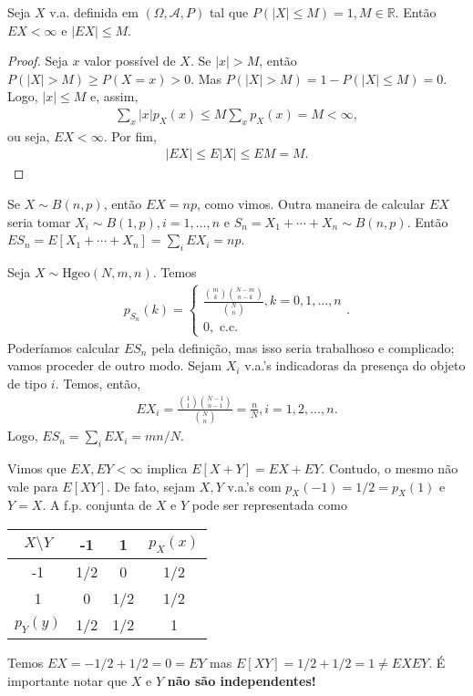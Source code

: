 \documentclass[../Notas.tex]{subfiles}
\begin{document}
\begin{theorem}
Seja $X$ v.a. definida em $(\Omega, \mathcal{A}, P)$ tal que $P(|X|\leq M) = 1, M\in\mathbb{R}$. Então $EX < \infty$ e $|EX|\leq M$.
\end{theorem}

\begin{proof}
Seja $x$ valor possível de $X$. Se $|x|>M$, então $P(|X|>M)\geq P(X=x)>0$. Mas $P(|X|>M) = 1 - P(|X|\leq M) = 0$. Logo, $|x|\leq M$ e, assim,
\begin{align*}
    \sum_x |x|p_X(x) \leq M\sum_x p_X(x) = M < \infty,
\end{align*}
ou seja, $EX < \infty$. Por fim,
\begin{align*}
    |EX| \leq E|X| \leq EM = M.
\end{align*}
\end{proof}

\begin{example}
Se $X\sim B(n,p)$, então $EX = np$, como vimos. Outra maneira de calcular $EX$ seria tomar $X_i\sim B(1,p), i=1,\dots, n$ e $S_n = X_1 + \cdots + X_n\sim B(n,p)$. Então $ES_n = E[X_1 + \cdots + X_n] = \sum_i EX_i = np$.
\end{example}

\begin{example}
Seja $X\sim\text{Hgeo}(N,m,n)$. Temos
\begin{align*}
    p_{S_n}(k) = \begin{cases}
    \frac{ \binom{m}{k}\binom{N-m}{n-k} }{ \binom{N}{n} }, k = 0,1,\dots,n \\
    0, \text{ c.c.}
    \end{cases}.
\end{align*}
Poderíamos calcular $ES_n$ pela definição, mas isso seria trabalhoso e complicado; vamos proceder de outro modo. Sejam $X_i$ v.a.'s indicadoras da presença do objeto de tipo $i$. Temos, então,
\begin{align*}
    EX_i = \frac{ \binom{1}{1}\binom{N-1}{n-1} }{\binom{N}{n}} = \frac{n}{N}, i = 1, 2, \dots, n.
\end{align*}
Logo, $ES_n = \sum_i EX_i = mn/N$.
\end{example}

\begin{remark}
Vimos que $EX, EY < \infty$ implica $E[X+Y] = EX+EY$. Contudo, o mesmo não vale para $E[XY]$. De fato, sejam $X,Y$ v.a.'s com $p_X(-1) = 1/2 = p_X(1)$ e $Y=X$. A f.p. conjunta de $X$ e $Y$ pode ser representada como
\begin{table}[H]
    \centering
    \begin{tabular}{c|c|c|c}
        $X\setminus Y$ & -1 & 1 & $p_X(x)$ \\
        \hline
        -1 & 1/2 & 0 & 1/2 \\
        1 & 0 & 1/2 & 1/2 \\
        \hline
        $p_Y(y)$ & 1/2 & 1/2 & 1
    \end{tabular}
\end{table}
Temos $EX = -1/2 + 1/2 = 0 = EY$ mas $E[XY] = 1/2 + 1/2 = 1 \neq EXEY$. É importante notar que $X$ e $Y$ \textbf{não são independentes!}
\end{remark}
\end{document}
